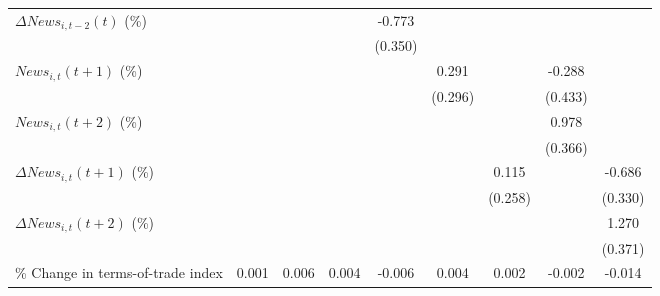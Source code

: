 {\begin{tabular}{l*{8}{c}}
\addlinespace
$ \Delta News_{i,t-2}(t)$ (\%)&                     &                     &                     &      -0.773\sym{*}  &                     &                     &                     &                     \\
                    &                     &                     &                     &     (0.350)         &                     &                     &                     &                     \\
\addlinespace
$ News_{i,t}(t+1)$ (\%)&                     &                     &                     &                     &       0.291         &                     &      -0.288         &                     \\
                    &                     &                     &                     &                     &     (0.296)         &                     &     (0.433)         &                     \\
\addlinespace
$ News_{i,t}(t+2)$ (\%)&                     &                     &                     &                     &                     &                     &       0.978\sym{**} &                     \\
                    &                     &                     &                     &                     &                     &                     &     (0.366)         &                     \\
\addlinespace
$ \Delta News_{i,t}(t+1)$ (\%)&                     &                     &                     &                     &                     &       0.115         &                     &      -0.686\sym{*}  \\
                    &                     &                     &                     &                     &                     &     (0.258)         &                     &     (0.330)         \\
\addlinespace
$ \Delta News_{i,t}(t+2)$ (\%)&                     &                     &                     &                     &                     &                     &                     &       1.270\sym{***}\\
                    &                     &                     &                     &                     &                     &                     &                     &     (0.371)         \\
\addlinespace
\% Change in terms-of-trade index&       0.001         &       0.006         &       0.004         &      -0.006         &       0.004         &       0.002         &      -0.002         &      -0.014         \\

\end{tabular}}
